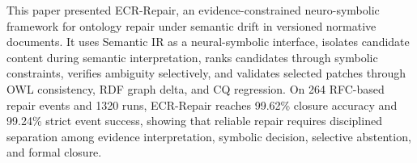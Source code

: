 \documentclass[conference]{IEEEtran}
\begin{document}
This paper presented ECR-Repair, an evidence-constrained neuro-symbolic framework for ontology repair under semantic drift in versioned normative documents. It uses Semantic IR as a neural-symbolic interface, isolates candidate content during semantic interpretation, ranks candidates through symbolic constraints, verifies ambiguity selectively, and validates selected patches through OWL consistency, RDF graph delta, and CQ regression. On 264 RFC-based repair events and 1320 runs, ECR-Repair reaches 99.62\% closure accuracy and 99.24\% strict event success, showing that reliable repair requires disciplined separation among evidence interpretation, symbolic decision, selective abstention, and formal closure.



\end{document}
